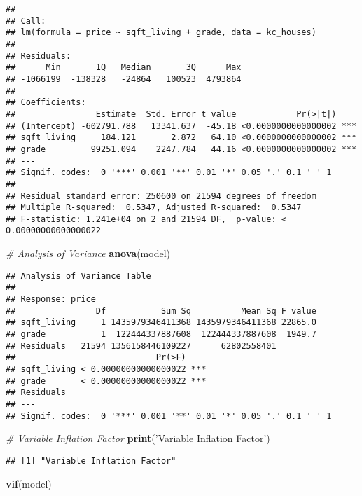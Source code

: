 \documentclass[]{article}
\newenvironment{Shaded}{\begin{snugshade}}{\end{snugshade}}
\newcommand{\CommentTok}[1]{\textcolor[rgb]{0.56,0.35,0.01}{\textit{#1}}}
\newcommand{\KeywordTok}[1]{\textcolor[rgb]{0.13,0.29,0.53}{\textbf{#1}}}
\newcommand{\NormalTok}[1]{#1}
\newcommand{\StringTok}[1]{\textcolor[rgb]{0.31,0.60,0.02}{#1}}
\begin{document}
\begin{verbatim}
## 
## Call:
## lm(formula = price ~ sqft_living + grade, data = kc_houses)
## 
## Residuals:
##      Min       1Q   Median       3Q      Max 
## -1066199  -138328   -24864   100523  4793864 
## 
## Coefficients:
##                Estimate  Std. Error t value            Pr(>|t|)    
## (Intercept) -602791.788   13341.637  -45.18 <0.0000000000000002 ***
## sqft_living     184.121       2.872   64.10 <0.0000000000000002 ***
## grade         99251.094    2247.784   44.16 <0.0000000000000002 ***
## ---
## Signif. codes:  0 '***' 0.001 '**' 0.01 '*' 0.05 '.' 0.1 ' ' 1
## 
## Residual standard error: 250600 on 21594 degrees of freedom
## Multiple R-squared:  0.5347, Adjusted R-squared:  0.5347 
## F-statistic: 1.241e+04 on 2 and 21594 DF,  p-value: < 0.00000000000000022
\end{verbatim}

\begin{Shaded}
\begin{Highlighting}[]
\CommentTok{# Analysis of Variance}
\KeywordTok{anova}\NormalTok{(model)}
\end{Highlighting}
\end{Shaded}

\begin{verbatim}
## Analysis of Variance Table
## 
## Response: price
##                Df           Sum Sq          Mean Sq F value
## sqft_living     1 1435979346411368 1435979346411368 22865.0
## grade           1  122444337887608  122444337887608  1949.7
## Residuals   21594 1356158446109227      62802558401        
##                            Pr(>F)    
## sqft_living < 0.00000000000000022 ***
## grade       < 0.00000000000000022 ***
## Residuals                            
## ---
## Signif. codes:  0 '***' 0.001 '**' 0.01 '*' 0.05 '.' 0.1 ' ' 1
\end{verbatim}

\begin{Shaded}
\begin{Highlighting}[]
\CommentTok{# Variable Inflation Factor}
\KeywordTok{print}\NormalTok{(}\StringTok{'Variable Inflation Factor'}\NormalTok{)}
\end{Highlighting}
\end{Shaded}

\begin{verbatim}
## [1] "Variable Inflation Factor"
\end{verbatim}

\begin{Shaded}
\begin{Highlighting}[]
\KeywordTok{vif}\NormalTok{(model)}
\end{Highlighting}
\end{Shaded}
\end{document}
